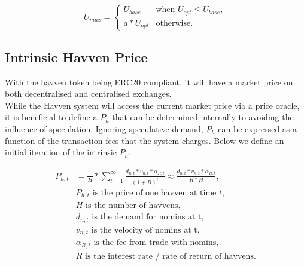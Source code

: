 \[
U_{max} = 
\begin{cases}
 U_{base} &\mbox{when } U_{opt} \leq U_{base}, \\[1em]
 a * U_{opt} &\mbox{otherwise}.
 \end{cases}
\]

\begin{center}
\end{center}

\newpage

\subsection{Intrinsic Havven Price} With the havven token being ERC20 compliant, it will have a market price on both decentralised and centralised exchanges. \\

\noindent While the Havven system will access the current market price via a price oracle, it is beneficial to define a $P_h$ that can be determined internally to avoiding the influence of speculation. Ignoring speculative demand, $P_h$ can be expressed as a function of the transaction fees that the system charges. Below we define an initial iteration of the intrinsic $P_h$.

\begin{align*} 
P_{h,t} &= \frac{1}{H}* \sum\limits_{t=1}^\infty \frac{d_{n,t} *v_{n,t} * \alpha_{R,t}}{(1+R)^t} \approx \frac{d_{n,t} *v_{n,t} * \alpha_{R,t}}{R * H}, \\
& P_{h,t} \text{ is the price of one havven at time } t, \\
& H \text{ is the number of havvens}, \\
& d_{n,t} \text{ is the demand for nomins at t}, \\
& v_{n,t} \text{ is the velocity of nomins at t}, \\
& \alpha_{R,t} \text{ is the fee from trade with nomins}, \\
& R \text{ is the interest rate / rate of return of havvens}. \\
\end{align*}

\newpage